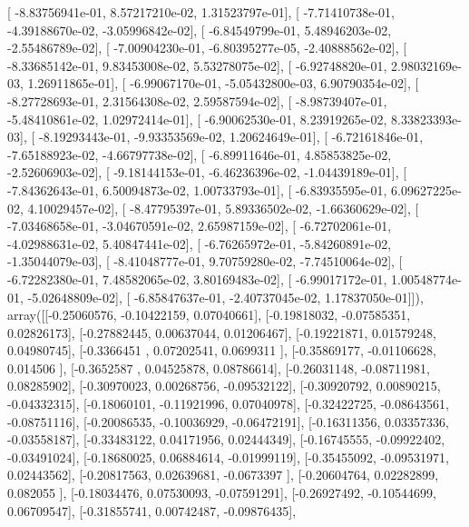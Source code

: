 \documentclass{article}
\begin{document}
       [ -8.83756941e-01,   8.57217210e-02,   1.31523797e-01],
       [ -7.71410738e-01,  -4.39188670e-02,  -3.05996842e-02],
       [ -6.84549799e-01,   5.48946203e-02,  -2.55486789e-02],
       [ -7.00904230e-01,  -6.80395277e-05,  -2.40888562e-02],
       [ -8.33685142e-01,   9.83453008e-02,   5.53278075e-02],
       [ -6.92748820e-01,   2.98032169e-03,   1.26911865e-01],
       [ -6.99067170e-01,  -5.05432800e-03,   6.90790354e-02],
       [ -8.27728693e-01,   2.31564308e-02,   2.59587594e-02],
       [ -8.98739407e-01,  -5.48410861e-02,   1.02972414e-01],
       [ -6.90062530e-01,   8.23919265e-02,   8.33823393e-03],
       [ -8.19293443e-01,  -9.93353569e-02,   1.20624649e-01],
       [ -6.72161846e-01,  -7.65188923e-02,  -4.66797738e-02],
       [ -6.89911646e-01,   4.85853825e-02,  -2.52606903e-02],
       [ -9.18144153e-01,  -6.46236396e-02,  -1.04439189e-01],
       [ -7.84362643e-01,   6.50094873e-02,   1.00733793e-01],
       [ -6.83935595e-01,   6.09627225e-02,   4.10029457e-02],
       [ -8.47795397e-01,   5.89336502e-02,  -1.66360629e-02],
       [ -7.03468658e-01,  -3.04670591e-02,   2.65987159e-02],
       [ -6.72702061e-01,  -4.02988631e-02,   5.40847441e-02],
       [ -6.76265972e-01,  -5.84260891e-02,  -1.35044079e-03],
       [ -8.41048777e-01,   9.70759280e-02,  -7.74510064e-02],
       [ -6.72282380e-01,   7.48582065e-02,   3.80169483e-02],
       [ -6.99017172e-01,   1.00548774e-01,  -5.02648809e-02],
       [ -6.85847637e-01,  -2.40737045e-02,   1.17837050e-01]]), array([[-0.25060576, -0.10422159,  0.07040661],
       [-0.19818032, -0.07585351,  0.02826173],
       [-0.27882445,  0.00637044,  0.01206467],
       [-0.19221871,  0.01579248,  0.04980745],
       [-0.3366451 ,  0.07202541,  0.0699311 ],
       [-0.35869177, -0.01106628,  0.014506  ],
       [-0.3652587 ,  0.04525878,  0.08786614],
       [-0.26031148, -0.08711981,  0.08285902],
       [-0.30970023,  0.00268756, -0.09532122],
       [-0.30920792,  0.00890215, -0.04332315],
       [-0.18060101, -0.11921996,  0.07040978],
       [-0.32422725, -0.08643561, -0.08751116],
       [-0.20086535, -0.10036929, -0.06472191],
       [-0.16311356,  0.03357336, -0.03558187],
       [-0.33483122,  0.04171956,  0.02444349],
       [-0.16745555, -0.09922402, -0.03491024],
       [-0.18680025,  0.06884614, -0.01999119],
       [-0.35455092, -0.09531971,  0.02443562],
       [-0.20817563,  0.02639681, -0.0673397 ],
       [-0.20604764,  0.02282899,  0.082055  ],
       [-0.18034476,  0.07530093, -0.07591291],
       [-0.26927492, -0.10544699,  0.06709547],
       [-0.31855741,  0.00742487, -0.09876435],
\end{document}
